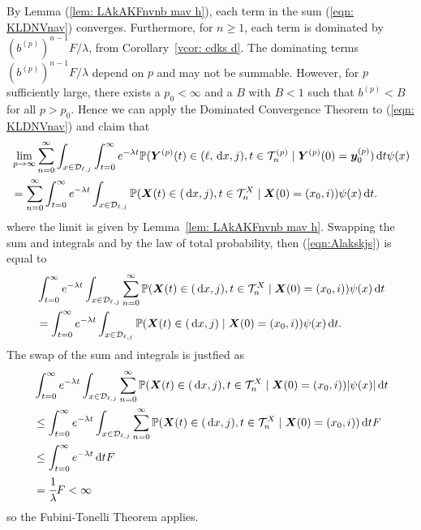 By Lemma (\ref{lem: LAkAKFnvnb mav h}), each term in the sum (\ref{eqn: KLDNVnav}) converges. Furthermore, for \(n\geq 1\), each term is dominated by \(\left(b^{(p)}\right)^{n-1}F/\lambda\), from Corollary~\ref{vcor: cdks d}. The dominating terms \(\left(b^{(p)}\right)^{n-1}F/\lambda\) depend on \(p\) and may not be summable. However, for \(p\) sufficiently large, there exists a \(p_0<\infty\) and a \(B\) with \(B<1\) such that \(b^{(p)}<B\) for all \(p>p_0\). Hence we can apply the Dominated Convergence Theorem to (\ref{eqn: KLDNVnav}) and claim that  
\begin{align}
	&\lim_{p\to\infty} \sum_{n=0}^\infty\int_{x\in\mathcal D_{\ell,j}}\int_{t=0}^\infty e^{-\lambda t} \mathbb P( {\boldsymbol Y}^{(p)}(t) \in (\ell, \, \mathrm{d} x, j), t\in\mathcal T_n^{(p)} \mid \nonumber 
	\boldsymbol Y^{(p)}(0)=\boldsymbol y_0^{(p)})\, \mathrm{d} t \psi(x)  \nonumber
	\\&= \sum_{n=0}^\infty\int_{t=0}^\infty e^{-\lambda t}  \int_{x\in\mathcal{D}_{\ell,j}}\mathbb P(\boldsymbol X(t)\in(\, \mathrm{d} x, j), t\in\mathcal T_n^X 
	\mid \boldsymbol X(0)=(x_0,i)) 
	\psi(x)\, \mathrm{d} t. \label{eqn:Alakskjs}
\end{align}
where the limit is given by Lemma~\ref{lem: LAkAKFnvnb mav h}. Swapping the sum and integrals and by the law of total probability, then (\ref{eqn:Alakskjs}) is equal to 
\begin{align}
	& \int_{t=0}^\infty e^{-\lambda t}  \int_{x\in\mathcal{D}_{\ell,j}}\sum_{n=0}^\infty\mathbb P(\boldsymbol X(t)\in(\, \mathrm{d} x, j), t\in\mathcal T_n^X 
	\mid \boldsymbol X(0)=(x_0, i))\psi(x)\, \mathrm{d} t \nonumber
	\\&= \int_{t=0}^\infty e^{-\lambda t}  \int_{x\in\mathcal{D}_{\ell,j}} \mathbb P(\boldsymbol X(t)\in(\, \mathrm{d} x, j)  
	\mid \boldsymbol X(0)=(x_0, i))\psi(x)\, \mathrm{d} t. \nonumber
\end{align}
The swap of the sum and integrals is justfied as 
\begin{align}
	& \int_{t=0}^\infty e^{-\lambda t}  \int_{x\in\mathcal{D}_{\ell,j}}\sum_{n=0}^\infty\mathbb P(\boldsymbol X(t)\in(\, \mathrm{d} x, j), t\in\mathcal T_n^X 
	\mid \boldsymbol X(0)=(x_0, i))|\psi(x)|\, \mathrm{d} t \nonumber
	\\&\leq\int_{t=0}^\infty e^{-\lambda t}  \int_{x\in\mathcal{D}_{\ell,j}}\sum_{n=0}^\infty\mathbb P(\boldsymbol X(t)\in(\, \mathrm{d} x, j), t\in\mathcal T_n^X 
	\mid \boldsymbol X(0)=(x_0, i))\, \mathrm{d} t  F\nonumber
	\\&\leq\int_{t=0}^\infty e^{-\lambda t} \, \mathrm{d} t  F\nonumber
	\\&=\cfrac{1}{\lambda}F<\infty
\end{align}
so the Fubini-Tonelli Theorem applies. 

